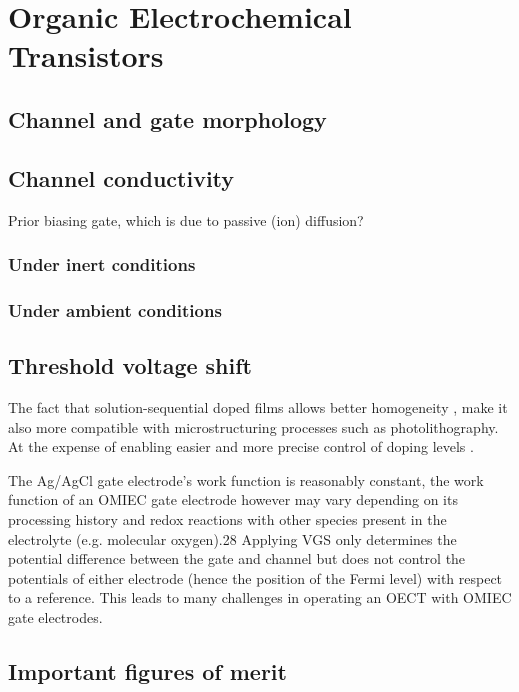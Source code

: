 \section{Organic Electrochemical Transistors}
\subsection{Channel and gate morphology}

\subsection{Channel conductivity}

Prior biasing gate, which is due to passive (ion) diffusion?

\subsubsection{Under inert conditions}

\subsubsection{Under ambient conditions}

\subsection{Threshold voltage shift}

The fact that solution-sequential doped films allows better homogeneity \cite{jacobsComparisonSolutionmixedSequentially2016}, make it also more compatible with microstructuring processes such as photolithography. At the expense of enabling easier and more precise control of doping levels \cite{tanOrganicMixedIonic2022}.

The Ag/AgCl gate electrode’s work function is reasonably constant, the work function of an OMIEC gate electrode however may vary depending on its processing history and redox reactions with other species present in the electrolyte (e.g. molecular oxygen).28 Applying VGS only determines the potential difference between the gate and channel but does not control the potentials of either electrode (hence the position of the Fermi level) with respect to a reference. This leads to many challenges in operating an OECT with OMIEC gate electrodes.


\subsection{Important figures of merit}



